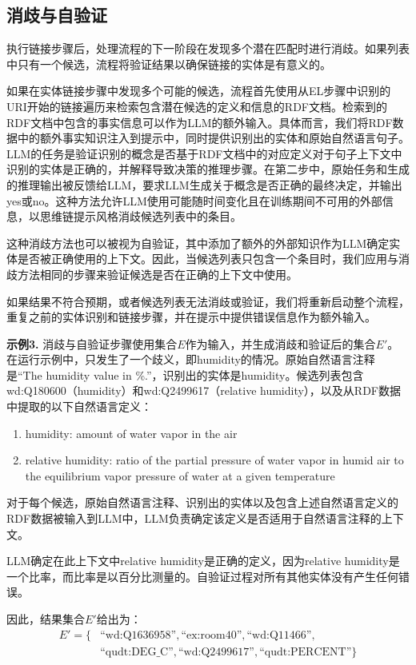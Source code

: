 \documentclass[supercite]{Experimental_Report}
\theoremstyle{definition}
\begin{document}
\subsection{消歧与自验证}

执行链接步骤后，处理流程的下一阶段在发现多个潜在匹配时进行消歧。如果列表中只有一个候选，流程将验证结果以确保链接的实体是有意义的。

如果在实体链接步骤中发现多个可能的候选，流程首先使用从EL步骤中识别的URI开始的链接遍历来检索包含潜在候选的定义和信息的RDF文档。检索到的RDF文档中包含的事实信息可以作为LLM的额外输入。具体而言，我们将RDF数据中的额外事实知识注入到提示中，同时提供识别出的实体和原始自然语言句子。LLM的任务是验证识别的概念是否基于RDF文档中的对应定义对于句子上下文中识别的实体是正确的，并解释导致决策的推理步骤。在第二步中，原始任务和生成的推理输出被反馈给LLM，要求LLM生成关于概念是否正确的最终决定，并输出yes或no。这种方法允许LLM使用可能随时间变化且在训练期间不可用的外部信息，以思维链提示风格消歧候选列表中的条目。

这种消歧方法也可以被视为自验证，其中添加了额外的外部知识作为LLM确定实体是否被正确使用的上下文。因此，当候选列表只包含一个条目时，我们应用与消歧方法相同的步骤来验证候选是否在正确的上下文中使用。

如果结果不符合预期，或者候选列表无法消歧或验证，我们将重新启动整个流程，重复之前的实体识别和链接步骤，并在提示中提供错误信息作为额外输入。

\textbf{示例3.} 消歧与自验证步骤使用集合$E$作为输入，并生成消歧和验证后的集合$E'$。在运行示例中，只发生了一个歧义，即humidity的情况。原始自然语言注释是``The humidity value in \%.''，识别出的实体是humidity。候选列表包含wd:Q180600（humidity）和wd:Q2499617（relative humidity），以及从RDF数据中提取的以下自然语言定义：
\begin{enumerate}
    \item humidity: amount of water vapor in the air
    \item relative humidity: ratio of the partial pressure of water vapor in humid air to the equilibrium vapor pressure of water at a given temperature
\end{enumerate}

对于每个候选，原始自然语言注释、识别出的实体以及包含上述自然语言定义的RDF数据被输入到LLM中，LLM负责确定该定义是否适用于自然语言注释的上下文。

LLM确定在此上下文中relative humidity是正确的定义，因为relative humidity是一个比率，而比率是以百分比测量的。自验证过程对所有其他实体没有产生任何错误。

因此，结果集合$E'$给出为：
\begin{equation}
\begin{split}
E' = \{&\text{``wd:Q1636958''}, \text{``ex:room40''}, \text{``wd:Q11466''}, \\
&\text{``qudt:DEG\_C''}, \text{``wd:Q2499617''}, \text{``qudt:PERCENT''}\}
\end{split}
\end{equation}
\end{document}
